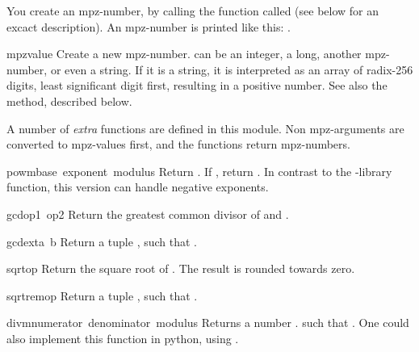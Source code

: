 You create an mpz-number, by calling the function called  (see
below for an excact description). An mpz-number is printed like this:
.

\renewcommand{\indexsubitem}{(in module mpz)}
\begin{funcdesc}{mpz}{value}
  Create a new mpz-number.  can be an integer, a long,
  another mpz-number, or even a string. If it is a string, it is
  interpreted as an array of radix-256 digits, least significant digit
  first, resulting in a positive number. See also the 
  method, described below.
\end{funcdesc}

A number of {\em extra} functions are defined in this module. Non
mpz-arguments are converted to mpz-values first, and the functions
return mpz-numbers.

\begin{funcdesc}{powm}{base\, exponent\, modulus}
  Return . If
  , return . In contrast to the
  \C-library function, this version can handle negative exponents.
\end{funcdesc}

\begin{funcdesc}{gcd}{op1\, op2}
  Return the greatest common divisor of  and .
\end{funcdesc}

\begin{funcdesc}{gcdext}{a\, b}
  Return a tuple , such that
  .
\end{funcdesc}

\begin{funcdesc}{sqrt}{op}
  Return the square root of . The result is rounded towards zero.
\end{funcdesc}

\begin{funcdesc}{sqrtrem}{op}
  Return a tuple , such that
  .
\end{funcdesc}

\begin{funcdesc}{divm}{numerator\, denominator\, modulus}
  Returns a number . such that
  .
  One could also implement this function in python, using .
\end{funcdesc}

